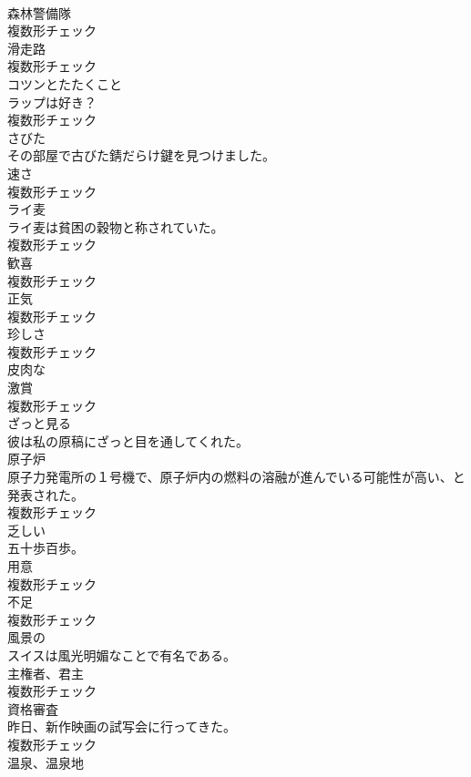 \documentclass[8pt]{extreport}
\begin{document}
\begin{CJK}{UTF8}{min}
\\	[名詞]	森林警備隊	
\\	複数形チェック
\\	[名詞]	滑走路	
\\	複数形チェック
\\	[名詞]	コツンとたたくこと	
\\	ラップは好き？	
\\	複数形チェック
\\	[形容詞]	さびた	
\\	その部屋で古びた錆だらけ鍵を見つけました。	
\\	[名詞]	速さ	
\\	複数形チェック
\\	[名詞]	ライ⻨	
\\	ライ麦は貧困の穀物と称されていた。	
\\	複数形チェック
\\	[名詞]	歓喜	
\\	複数形チェック
\\	[名詞]	正気	
\\	複数形チェック
\\	[名詞]	珍しさ	
\\	複数形チェック
\\	[形容詞]	皮肉な	
\\	[名詞]	激賞	
\\	複数形チェック
\\	[動詞]	ざっと見る	
\\	彼は私の原稿にざっと目を通してくれた。	
\\	[名詞]	原子炉	
\\	原子力発電所の１号機で、原子炉内の燃料の溶融が進んでいる可能性が高い、と発表された。	
\\	複数形チェック
\\	[形容詞]	乏しい	
\\	五十歩百歩。	
\\	[名詞]	用意	
\\	複数形チェック
\\	[名詞]	不足	
\\	複数形チェック
\\	[形容詞]	風景の	
\\	スイスは風光明媚なことで有名である。	
\\	[名詞]	主権者、君主	
\\	複数形チェック
\\	[名詞]	資格審査	
\\	昨日、新作映画の試写会に行ってきた。	
\\	複数形チェック
\\	[名詞]	温泉、温泉地	

\end{CJK}
\end{document}
